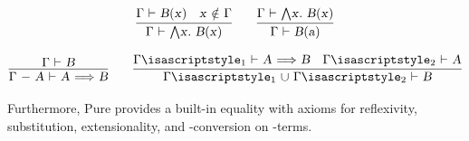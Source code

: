 \begin{isabellebody}
\begin{isamarkuptext}
  \[
  \infer{\isa{{\isachardoublequote}{\isasymGamma}\ {\isasymturnstile}\ {\isasymAnd}x{\isachardot}\ B{\isacharparenleft}x{\isacharparenright}{\isachardoublequote}}}{\isa{{\isachardoublequote}{\isasymGamma}\ {\isasymturnstile}\ B{\isacharparenleft}x{\isacharparenright}{\isachardoublequote}} & \isa{{\isachardoublequote}x\ {\isasymnotin}\ {\isasymGamma}{\isachardoublequote}}}
  \qquad
  \infer{\isa{{\isachardoublequote}{\isasymGamma}\ {\isasymturnstile}\ B{\isacharparenleft}a{\isacharparenright}{\isachardoublequote}}}{\isa{{\isachardoublequote}{\isasymGamma}\ {\isasymturnstile}\ {\isasymAnd}x{\isachardot}\ B{\isacharparenleft}x{\isacharparenright}{\isachardoublequote}}}
  \]

  \[
  \infer{\isa{{\isachardoublequote}{\isasymGamma}\ {\isacharminus}\ A\ {\isasymturnstile}\ A\ {\isasymLongrightarrow}\ B{\isachardoublequote}}}{\isa{{\isachardoublequote}{\isasymGamma}\ {\isasymturnstile}\ B{\isachardoublequote}}}
  \qquad
  \infer{\isa{{\isachardoublequote}{\isasymGamma}\isactrlsub {\isadigit{1}}\ {\isasymunion}\ {\isasymGamma}\isactrlsub {\isadigit{2}}\ {\isasymturnstile}\ B{\isachardoublequote}}}{\isa{{\isachardoublequote}{\isasymGamma}\isactrlsub {\isadigit{1}}\ {\isasymturnstile}\ A\ {\isasymLongrightarrow}\ B{\isachardoublequote}} & \isa{{\isachardoublequote}{\isasymGamma}\isactrlsub {\isadigit{2}}\ {\isasymturnstile}\ A{\isachardoublequote}}}
  \]

  Furthermore, Pure provides a built-in equality  with axioms for reflexivity, substitution, extensionality,
  and \isa{{\isachardoublequote}{\isasymalpha}{\isasymbeta}{\isasymeta}{\isachardoublequote}}-conversion on \isa{{\isachardoublequote}{\isasymlambda}{\isachardoublequote}}-terms.


\end{isamarkuptext}
\end{isabellebody}

